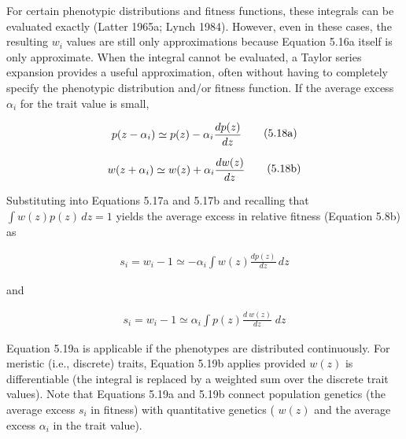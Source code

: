 \documentclass{article}
\begin{document}
For certain phenotypic distributions and fitness functions, these integrals can be evaluated exactly (Latter 1965a; Lynch 1984). However, even in these cases, the resulting  $ w_i $ values are still only approximations because Equation 5.16a itself is only approximate. When the integral cannot be evaluated, a Taylor series expansion provides a useful approximation, often without having to completely specify the phenotypic distribution and/or fitness function. If the average excess  $ \alpha_i $ for the trait value is small,

\begin{equation}
\begin{align*}p(z-\alpha_i)\simeq p(z)-\alpha_i {d p(z)\over dz}\end{align*}
\tag{5.18a}
\label{eq:5_18a}
\end{equation}

\begin{equation}
\begin{align*}w(z+\alpha_i)\simeq w(z)+\alpha_i{d w(z)\over dz}\end{align*}
\tag{5.18b}
\label{eq:5_18b}
\end{equation}

Substituting into Equations 5.17a and 5.17b and recalling that  $ \int w(z)p(z)\,dz = 1 $ yields the average excess in relative fitness (Equation 5.8b) as

\begin{equation}
\begin{align*}s_i=w_i-1\simeq-\alpha_i\int w(z)\frac{dp(z)}{dz}\,dz\end{align*}
\tag{5.19a}
\label{eq:5_19a}
\end{equation}

and

\begin{equation}
\begin{align*}s_i=w_i-1\simeq\alpha_i\int p(z)\frac{d\ w(z)}{dz}\;dz\end{align*}
\tag{5.19b}
\label{eq:5_19b}
\end{equation}

Equation 5.19a is applicable if the phenotypes are distributed continuously. For meristic (i.e., discrete) traits, Equation 5.19b applies provided  $ w(z) $ is differentiable (the integral is replaced by a weighted sum over the discrete trait values). Note that Equations 5.19a and 5.19b connect population genetics (the average excess  $ s_i $ in fitness) with quantitative genetics ( $ w(z) $ and the average excess  $ \alpha_i $ in the trait value).
\end{document}
